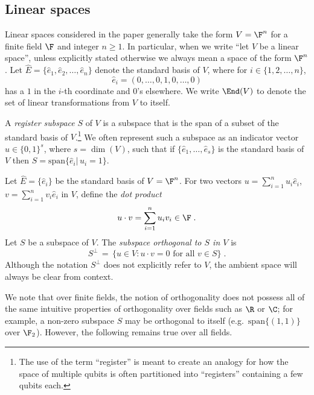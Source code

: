 \subsection{Linear spaces}
\label{sec:linear-spaces}

Linear spaces considered in the paper generally take the form $V = \F^n$ for a
finite field $\F$ and integer $n \geq 1$.
In particular, when we write ``let $V$ be a linear space'', unless explicitly
stated otherwise we always mean a space of the form $\F^n$.
Let $\hat{E} = \{ \hat{e}_1, \hat{e}_2, \ldots, \hat{e}_n\}$ denote the standard basis of $V$, where for
$i \in\{ 1, 2, \ldots, n\}$,
\begin{equation*}
  \hat{e}_i = (0, \ldots, 0, 1, 0, \ldots, 0)
\end{equation*}
has a $1$ in the $i$-th coordinate and $0$'s elsewhere.
We write $\End(V)$ to denote the set of linear transformations from $V$ to
itself.
\begin{definition}
  A \emph{register subspace} $S$ of $V$ is a subspace that is the span of a
  subset of the standard basis of $V$.\footnote{The use of the term ``register''
    is meant to create an analogy for how the space of multiple qubits is often
    partitioned into ``registers'' containing a few qubits each.}
  We often represent such a subspace as an indicator vector $u\in \{0,1\}^s$,
  where $s=\dim(V)$, such that if $\{\hat{e}_1,\ldots,\hat{e}_s\}$ is the standard basis of
  $V$ then $S = \text{span}\{\hat{e}_i|\,u_i=1\}$.
\end{definition}

\begin{definition}
  Let $\hat{E} = \{ \hat{e}_i\}$ be the standard basis of $V = \F^n$.
  For two vectors $u = \sum_{i=1}^n u_i \hat{e}_i$, $v = \sum_{i=1}^n v_i \hat{e}_i$ in $V$,
  define the \emph{dot product}
  \begin{equation*}
    u \cdot v = \sum_{i=1}^n u_i v_i \in \F\;.
  \end{equation*}
  Let $S$ be a subspace of $V$. The \emph{subspace orthogonal to $S$ in $V$} is
  \begin{equation*}
    S^\perp \,=\, \big\{ u \in V : u \cdot v = 0
    \text{ for all }  v \in S \big\}\;.
  \end{equation*}
  Although the notation $S^\perp$ does not explicitly refer to $V$, the ambient
  space will always be clear from context.
\end{definition}

We note that over finite fields, the notion of orthogonality does not possess
all of the same intuitive properties of orthogonality over fields such as $\R$
or $\C$; for example, a non-zero subspace $S$ may be orthogonal to itself (e.g.\
$\mathrm{span} \{ (1,1) \}$ over $\F_2$).
However, the following remains true over all fields.

